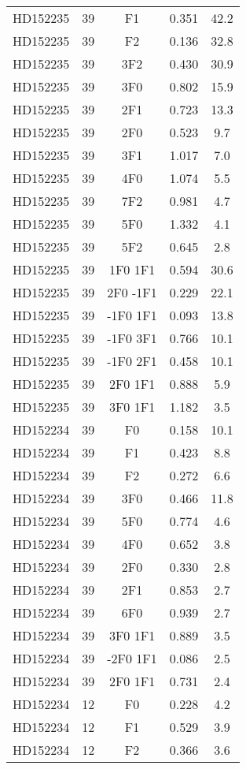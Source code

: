 \begin{table*}
\begin{tabular}{l c c c c}
HD152235 & 39 & F1 & 0.351 & 42.2\\ 
HD152235 & 39 & F2 & 0.136 & 32.8\\ 
HD152235 & 39 & 3F2 & 0.430 & 30.9\\ 
HD152235 & 39 & 3F0 & 0.802 & 15.9\\ 
HD152235 & 39 & 2F1 & 0.723 & 13.3\\ 
HD152235 & 39 & 2F0 & 0.523 & 9.7\\ 
HD152235 & 39 & 3F1 & 1.017 & 7.0\\ 
HD152235 & 39 & 4F0 & 1.074 & 5.5\\ 
HD152235 & 39 & 7F2 & 0.981 & 4.7\\ 
HD152235 & 39 & 5F0 & 1.332 & 4.1\\ 
HD152235 & 39 & 5F2 & 0.645 & 2.8\\ 
HD152235 & 39 & 1F0 1F1 & 0.594 & 30.6\\ 
HD152235 & 39 & 2F0 -1F1 & 0.229 & 22.1\\ 
HD152235 & 39 & -1F0 1F1 & 0.093 & 13.8\\ 
HD152235 & 39 & -1F0 3F1 & 0.766 & 10.1\\ 
HD152235 & 39 & -1F0 2F1 & 0.458 & 10.1\\ 
HD152235 & 39 & 2F0 1F1 & 0.888 & 5.9\\ 
HD152235 & 39 & 3F0 1F1 & 1.182 & 3.5\\ 
\hline
HD152234 & 39 & F0 & 0.158 & 10.1\\ 
HD152234 & 39 & F1 & 0.423 & 8.8\\ 
HD152234 & 39 & F2 & 0.272 & 6.6\\ 
HD152234 & 39 & 3F0 & 0.466 & 11.8\\ 
HD152234 & 39 & 5F0 & 0.774 & 4.6\\ 
HD152234 & 39 & 4F0 & 0.652 & 3.8\\ 
HD152234 & 39 & 2F0 & 0.330 & 2.8\\ 
HD152234 & 39 & 2F1 & 0.853 & 2.7\\ 
HD152234 & 39 & 6F0 & 0.939 & 2.7\\ 
HD152234 & 39 & 3F0 1F1 & 0.889 & 3.5\\ 
HD152234 & 39 & -2F0 1F1 & 0.086 & 2.5\\ 
HD152234 & 39 & 2F0 1F1 & 0.731 & 2.4\\ 
\hline
HD152234 & 12 & F0 & 0.228 & 4.2\\ 
HD152234 & 12 & F1 & 0.529 & 3.9\\ 
HD152234 & 12 & F2 & 0.366 & 3.6\\ 

\end{tabular}
\end{table*}
